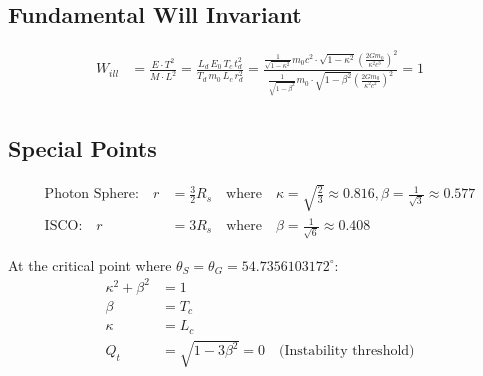 \documentclass{article}
\begin{document}
\subsection{Fundamental Will Invariant}

\begin{align}
    W_{ill} &= \frac{E \cdot T^2}{M \cdot L^2} = \frac{L_d\,E_0\,T_c\,t_{d}^{2}}{T_d\,m_0\,L_c\,r_{d}^{2}}= \frac{\frac{1}{\sqrt{1-\kappa^{2}}}m_{0}c^{2}\cdot\sqrt{1-\kappa^{2}}\left(\frac{2Gm_{0}}{\kappa^{2}c^{3}}\right)^{2}}{\frac{1}{\sqrt{1-\beta^{2}}}m_{0}\cdot\sqrt{1-\beta^{2}}\left(\frac{2Gm_{0}}{\kappa^{2}c^{2}}\right)^{2}}=1 \\
\end{align}

\subsection{Special Points}

\begin{align}
    \text{Photon Sphere:} \quad r &= \frac{3}{2}R_s \quad \text{where} \quad \kappa = \sqrt{\frac{2}{3}} \approx 0.816, \beta = \frac{1}{\sqrt{3}} \approx 0.577 \\
    \text{ISCO:} \quad r &= 3R_s \quad \text{where} \quad \beta = \frac{1}{\sqrt{6}} \approx 0.408
\end{align}

At the critical point where $\theta_S = \theta_G = 54.7356103172^{\circ}$:
\begin{align}
    \kappa^2 + \beta^2 &= 1 \\
    \beta &= T_c \\
    \kappa &= L_c \\
    Q_t &= \sqrt{1-3\beta^2} = 0 \quad \text{(Instability threshold)}
\end{align}
\end{document}
